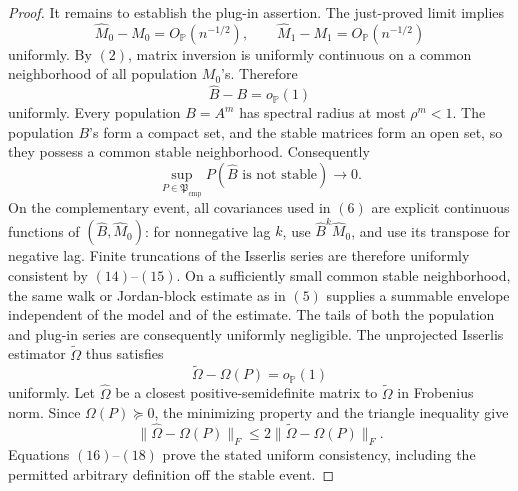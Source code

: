 \documentclass{article}
\begin{document}
\begin{proof}
It remains to establish the plug-in assertion.  The just-proved limit implies
\[
 \widehat M_0-M_0=O_{\mathbb P}(n^{-1/2}),
 \qquad
 \widehat M_1-M_1=O_{\mathbb P}(n^{-1/2})                  \tag{14}
\]
uniformly.  By \((2)\), matrix inversion is uniformly continuous on a common neighborhood of all population \(M_0\)'s.  Therefore
\[
 \widehat B-B=o_{\mathbb P}(1)                             \tag{15}
\]
uniformly.  Every population \(B=A^m\) has spectral radius at most \(\rho^m<1\).  The population \(B\)'s form a compact set, and the stable matrices form an open set, so they possess a common stable neighborhood.  Consequently
\[
 \sup_{P\in\mathfrak P_{\mathrm{cmp}}}
 P(\widehat B\text{ is not stable})\longrightarrow0.       \tag{16}
\]
On the complementary event, all covariances used in \((6)\) are explicit continuous functions of \((\widehat B,\widehat M_0)\): for nonnegative lag \(k\), use \(\widehat B^k\widehat M_0\), and use its transpose for negative lag.  Finite truncations of the Isserlis series are therefore uniformly consistent by \((14)\)--\((15)\).  On a sufficiently small common stable neighborhood, the same walk or Jordan-block estimate as in \((5)\) supplies a summable envelope independent of the model and of the estimate.  The tails of both the population and plug-in series are consequently uniformly negligible.  The unprojected Isserlis estimator \(\widetilde\Omega\) thus satisfies
\[
 \widetilde\Omega-\Omega(P)=o_{\mathbb P}(1)              \tag{17}
\]
uniformly.  Let \(\widehat\Omega\) be a closest positive-semidefinite matrix to \(\widetilde\Omega\) in Frobenius norm.  Since \(\Omega(P)\succeq0\), the minimizing property and the triangle inequality give
\[
 \lVert\widehat\Omega-\Omega(P)\rVert_F
 \le2\lVert\widetilde\Omega-\Omega(P)\rVert_F.           \tag{18}
\]
Equations \((16)\)--\((18)\) prove the stated uniform consistency, including the permitted arbitrary definition off the stable event.
\end{proof}
\end{document}
